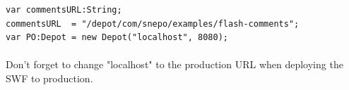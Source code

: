 \documentclass[12pt]{report}
\begin{document}
\begin{appendices}
\begin{Verbatim}[frame=single]
var commentsURL:String;
commentsURL  = "/depot/com/snepo/examples/flash-comments";
var PO:Depot = new Depot("localhost", 8080);
\end{Verbatim}

\paragraph{}
Don't forget to change "localhost" to the production URL when deploying
the SWF to production.


\end{appendices}
\end{document}
